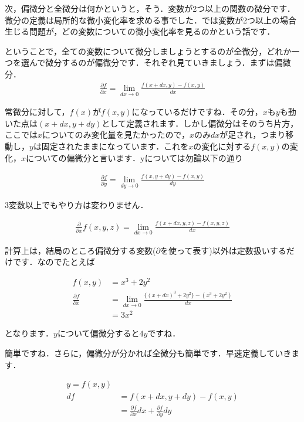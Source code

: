 \documentclass[11pt,a4paper]{ujreport}
\begin{document}
次，偏微分と全微分は何かというと，そう．変数が2つ以上の関数の微分です．微分の定義は局所的な微小変化率を求める事でした．では変数が2つ以上の場合生じる問題が，どの変数についての微小変化率を見るのかという話です．

ということで，全ての変数について微分しましょうとするのが全微分，どれか一つを選んで微分するのが偏微分です．それぞれ見ていきましょう．まずは偏微分．\\

\begin{eqnarray}
\label{eq:partial}
\frac{\partial f}{\partial x} = \lim_{dx \rightarrow 0} \frac{f(x+dx, y) - f(x, y)}{dx}
\end{eqnarray}

常微分に対して，$f(x)$が$f(x,y)$になっているだけですね．その分，$x$も$y$も動いた点は$(x+dx, y+dy)$として定義されます．しかし偏微分はそのうち片方，ここでは$x$についてのみ変化量を見たかったので，$x$のみ$dx$が足され，つまり移動し，$y$は固定されたままになっています．これを$x$の変化に対する$f(x,y)$の変化，$x$についての偏微分と言います．yについては勿論以下の通り

\begin{eqnarray}
\frac{\partial f}{\partial y} = \lim_{dy \rightarrow 0} \frac{f(x, y+dy) - f(x, y)}{dy}
\end{eqnarray}

3変数以上でもやり方は変わりません．

\begin{eqnarray}
\frac{\partial}{\partial x}f(x,y,z) = \lim_{dx \rightarrow 0} \frac{f(x+dx, y,z) - f(x, y,z)}{dx}
\end{eqnarray}

計算上は，結局のところ偏微分する変数($\partial$を使って表す)以外は定数扱いするだけです．なのでたとえば

\begin{align}
f(x,y) &= x^3 + 2y^2\\
\frac{\partial f}{\partial x} &= \lim_{dx \rightarrow 0} \frac{\{(x+dx)^3 + 2y^2\} - (x^3 + 2y^2)}{dx}\\
&= 3x^2
\end{align}

となります．$y$について偏微分すると$4y$ですね．

簡単ですね．さらに，偏微分が分かれば全微分も簡単です．早速定義していきます．

\begin{align}
\label{eq:all-partial}
y = f(x,y) \nonumber \\
df &= f(x+dx, y+dy) - f(x,y)\\ 
&= \frac{\partial f}{\partial x}dx + \frac{\partial f}{\partial y}dy
\end{align}
\end{document}
